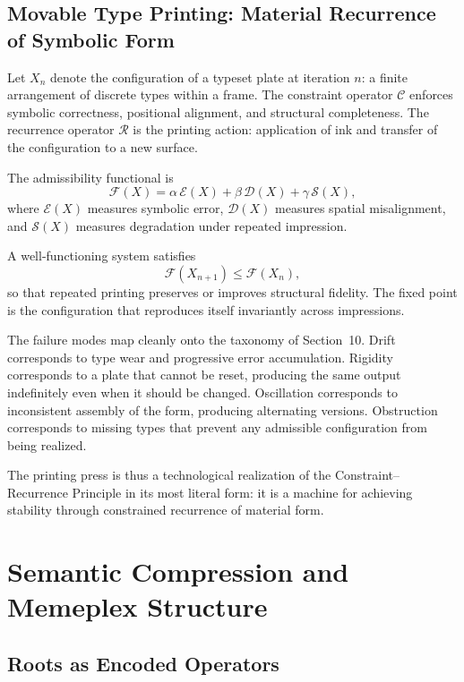 \documentclass[12pt, oneside]{article}
\theoremstyle{definition}
\theoremstyle{remark}
\begin{document}
\subsection{Movable Type Printing: Material Recurrence of Symbolic Form}

Let $X_{n}$ denote the configuration of a typeset plate at iteration $n$: a finite arrangement of discrete types within a frame.
The constraint operator $\mathcal{C}$ enforces symbolic correctness, positional alignment, and structural completeness.
The recurrence operator $\mathcal{R}$ is the printing action: application of ink and transfer of the configuration to a new surface.

The admissibility functional is
\[
\mathcal{F}(X) = \alpha\, \mathcal{E}(X) + \beta\, \mathcal{D}(X) + \gamma\, \mathcal{S}(X),
\]
where $\mathcal{E}(X)$ measures symbolic error, $\mathcal{D}(X)$ measures spatial misalignment, and $\mathcal{S}(X)$ measures degradation under repeated impression.

A well-functioning system satisfies
\[
\mathcal{F}(X_{n+1}) \leq \mathcal{F}(X_{n}),
\]
so that repeated printing preserves or improves structural fidelity.
The fixed point is the configuration that reproduces itself invariantly across impressions.

The failure modes map cleanly onto the taxonomy of Section~10.
Drift corresponds to type wear and progressive error accumulation.
Rigidity corresponds to a plate that cannot be reset, producing the same output indefinitely even when it should be changed.
Oscillation corresponds to inconsistent assembly of the form, producing alternating versions.
Obstruction corresponds to missing types that prevent any admissible configuration from being realized.

The printing press is thus a technological realization of the Constraint--Recurrence Principle in its most literal form: it is a machine for achieving stability through constrained recurrence of material form.

\section{Semantic Compression and Memeplex Structure}

\subsection{Roots as Encoded Operators}
\end{document}
